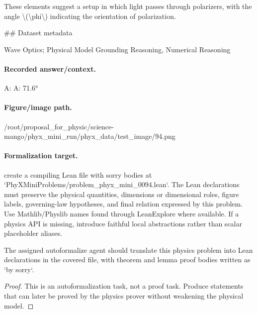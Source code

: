 These elements suggest a setup in which light passes through polarizers, with the angle \textbackslash{}(\textbackslash{}phi\textbackslash{}) indicating the orientation of polarization.

\#\# Dataset metadata

Wave Optics; Physical Model Grounding Reasoning, Numerical Reasoning

\paragraph{Recorded answer/context.}
A: A: 71.6°

\paragraph{Figure/image path.}
/root/proposal\_for\_physic/science-mango/phyx\_mini\_run/phyx\_data/test\_image/94.png

\paragraph{Formalization target.}
create a compiling Lean file with sorry bodies at `PhyXMiniProblems/problem\_phyx\_mini\_0094.lean`. The Lean declarations must preserve the physical quantities, dimensions or dimensional roles, figure labels, governing-law hypotheses, and final relation expressed by this problem.
Use Mathlib/Physlib names found through LeanExplore where available. If a physics API is missing, introduce faithful local abstractions rather than scalar placeholder aliases.

\begin{theorem}
\label{thm:physics:phyx_mini_0094:target}
The assigned autoformalize agent should translate this physics problem into Lean declarations in the covered file, with theorem and lemma proof bodies written as `by sorry`.
\end{theorem}
\begin{proof}
This is an autoformalization task, not a proof task. Produce statements that can later be proved by the physics prover without weakening the physical model.
\end{proof}

